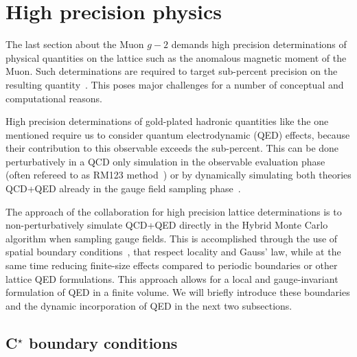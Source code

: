 \section{High precision physics}


The last section about the Muon $g-2$ demands high precision determinations of physical quantities on the lattice such as the anomalous magnetic moment of the Muon.
Such determinations are required to 
target sub-percent precision on the resulting quantity~\cite{RBC_2024, bmw_2017, Djukanovic:2024cmq, bmw_2024, milc_gm2, ExtendedTwistedMass:2022jpw, FermilabLattice:2024yho,snowmass:2020,snowmass:2025}.
This poses major challenges for a number of conceptual and computational reasons.

High precision determinations of gold-plated hadronic quantities like the one mentioned require us to consider quantum electrodynamic (QED) effects, because their contribution to this observable exceeds the sub-percent.
This can be done perturbatively in a QCD only simulation in the observable evaluation phase (often refereed to as RM123 method~\cite{deDivitiis:2011eh,deDivitiis:2013xla}) or by dynamically simulating both theories QCD+QED already in the gauge field sampling phase~\cite{Lucini:2015,10.1143/PTP.120.413,PhysRevLett.117.072002,Blum:2017cer,Feng:2018qpx}.

The approach of the \RCstar collaboration for high precision lattice determinations is to non-perturbatively simulate QCD+QED directly in the Hybrid Monte Carlo algorithm when sampling gauge fields.
This is accomplished through the use of \Cstar spatial boundary conditions~\cite{cstar:Wiese1992,cstar:Polley1993,cstar:Kronfeld1991,cstar:Kronfeld1993}, that respect locality and Gauss' law, while at the same time reducing finite-size effects compared to periodic boundaries or other lattice QED formulations.
This approach allows for a local and gauge-invariant formulation of QED in a finite volume.
We will briefly introduce these boundaries and the dynamic incorporation of QED in the next two subsections.

\subsection{C\texorpdfstring{$^{\star}$}{*} boundary conditions}
\label{sec:intro:cstar}

